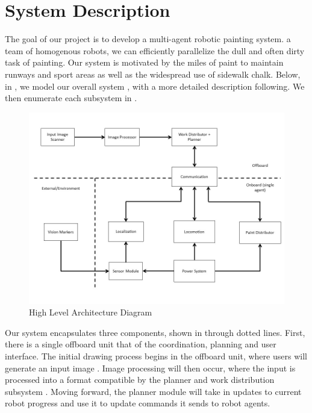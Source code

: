 
\section{System Description}
\label{sec:system_description}

The goal of our project is to develop a multi-agent robotic painting system.  a team of homogenous robots, we can efficiently parallelize the dull and often dirty task of painting. Our system is motivated by the miles of paint  to maintain runways and sport areas as well as the widespread use of sidewalk chalk. Below, in , we model our overall system , with a more detailed description following. We then enumerate each subsystem in .

\begin{figure}[h!]
 \centering
  \includegraphics[width=0.90\columnwidth]{diagrams/systems_diagram.jpg}
	\caption{High Level Architecture Diagram}
 \label{fig:system_description}
\end{figure}

Our system encapsulates three components, shown in  through dotted lines. First, there is a single offboard unit that  of the coordination, planning and user interface. The initial drawing process begins in the offboard unit, where users will generate an input image 
. Image processing will then occur, where the input is processed into a format compatible by the planner and work distribution subsystem . Moving forward, the planner module will take in updates to current robot progress and use it to update commands it sends to robot agents.

